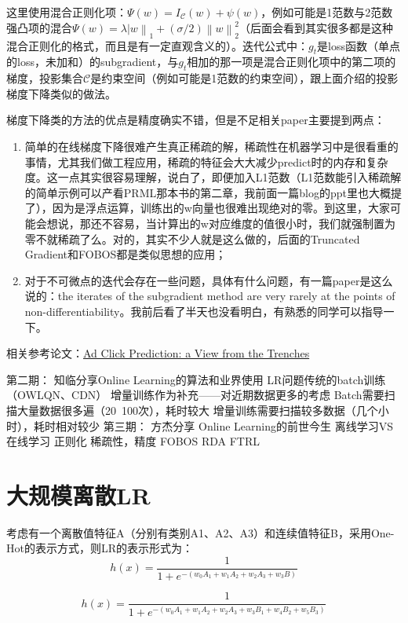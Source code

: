 \documentclass[10pt,a4paper]{ctexbook}
\begin{document}
这里使用混合正则化项：$\Psi(w)=I_{\mathcal{C}}(w)+\psi(w)$，例如可能是1范数与2范数强凸项的混合$\Psi(w)=\lambda\left|w\right\|_{1}+(\sigma/2)\left\|w\right\|_{2}^{2}$（后面会看到其实很多都是这种混合正则化的格式，而且是有一定直观含义的）。迭代公式中：$g_{t}$是loss函数（单点的loss，未加和）的subgradient，与$g_{t}$相加的那一项是混合正则化项中的第二项的梯度，投影集合$\mathcal{C}$是约束空间（例如可能是1范数的约束空间），跟上面介绍的投影梯度下降类似的做法。

梯度下降类的方法的优点是精度确实不错，但是不足相关paper主要提到两点：

\begin{enumerate}
\item 简单的在线梯度下降很难产生真正稀疏的解，稀疏性在机器学习中是很看重的事情，尤其我们做工程应用，稀疏的特征会大大减少predict时的内存和复杂度。这一点其实很容易理解，说白了，即便加入L1范数（L1范数能引入稀疏解的简单示例可以产看PRML那本书的第二章，我前面一篇blog的ppt里也大概提了），因为是浮点运算，训练出的w向量也很难出现绝对的零。到这里，大家可能会想说，那还不容易，当计算出的w对应维度的值很小时，我们就强制置为零不就稀疏了么。对的，其实不少人就是这么做的，后面的Truncated Gradient和FOBOS都是类似思想的应用；

\item 对于不可微点的迭代会存在一些问题，具体有什么问题，有一篇paper是这么说的：the iterates of the subgradient method are very rarely at the points of non-differentiability。我前后看了半天也没看明白，有熟悉的同学可以指导一下。
\end{enumerate}

相关参考论文：\href{https://www.eecs.tufts.edu/~dsculley/papers/ad-click-prediction.pdf}{Ad Click Prediction: a View from the Trenches}



第二期： 知临分享Online Learning的算法和业界使用
LR问题传统的batch训练（OWLQN、CDN）
增量训练作为补充——对近期数据更多的考虑
Batch需要扫描大量数据很多遍（20~100次），耗时较大
增量训练需要扫描较多数据（几个小时），耗时相对较少
第三期： 方杰分享 Online Learning的前世今生
离线学习VS在线学习
正则化
稀疏性，精度
FOBOS
RDA
FTRL


\section{大规模离散LR}
考虑有一个离散值特征A（分别有类别A1、A2、A3）和连续值特征B，采用One-Hot的表示方式，则LR的表示形式为：
\[
h(x)=\frac{1}{1+e^{-(w_{0}A_{1}+w_{1}A_{2}+w_{2}A_{3}+w_{3}B)}}
\]

\[
h(x)=\frac{1}{1+e^{-(w_{0}A_{1}+w_{1}A_{2}+w_{2}A_{3}+w_{3}B_{1}+w_{4}B_{2}+w_{5}B_{3})}}
\]




\ifx\mlbook\undefined
    
\end{document}
